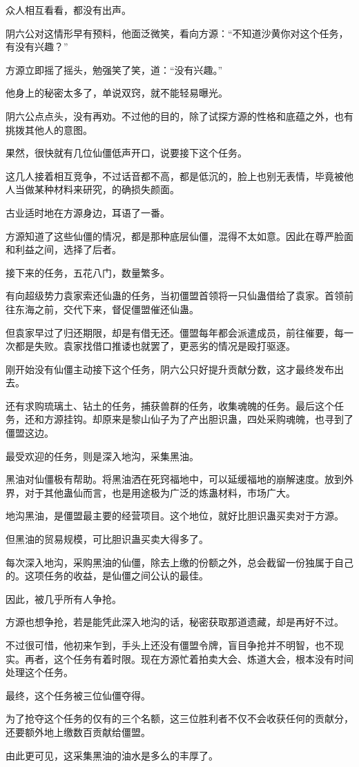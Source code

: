\begin{this_body}
众人相互看看，都没有出声。

阴六公对这情形早有预料，他面泛微笑，看向方源：“不知道沙黄你对这个任务，有没有兴趣？”

方源立即摇了摇头，勉强笑了笑，道：“没有兴趣。”

他身上的秘密太多了，单说双窍，就不能轻易曝光。

阴六公点点头，没有再劝。不过他的目的，除了试探方源的性格和底蕴之外，也有挑拨其他人的意图。

果然，很快就有几位仙僵低声开口，说要接下这个任务。

这几人接着相互竞争，不过话音都不高，都是低沉的，脸上也别无表情，毕竟被他人当做某种材料来研究，的确损失颜面。

古业适时地在方源身边，耳语了一番。

方源知道了这些仙僵的情况，都是那种底层仙僵，混得不太如意。因此在尊严脸面和利益之间，选择了后者。

接下来的任务，五花八门，数量繁多。

有向超级势力袁家索还仙蛊的任务，当初僵盟首领将一只仙蛊借给了袁家。首领前往东海之前，交代下来，督促僵盟催还仙蛊。

但袁家早过了归还期限，却是有借无还。僵盟每年都会派遣成员，前往催要，每一次都是失败。袁家找借口推诿也就罢了，更恶劣的情况是殴打驱逐。

刚开始没有仙僵主动接下这个任务，阴六公只好提升贡献分数，这才最终发布出去。

还有求购琉璃土、钻土的任务，捕获兽群的任务，收集魂魄的任务。最后这个任务，还和方源挂钩。却原来是黎山仙子为了产出胆识蛊，四处采购魂魄，也寻到了僵盟这边。

最受欢迎的任务，则是深入地沟，采集黑油。

黑油对仙僵极有帮助。将黑油洒在死窍福地中，可以延缓福地的崩解速度。放到外界，对于其他蛊仙而言，也是用途极为广泛的炼蛊材料，市场广大。

地沟黑油，是僵盟最主要的经营项目。这个地位，就好比胆识蛊买卖对于方源。

但黑油的贸易规模，可比胆识蛊买卖大得多了。

每次深入地沟，采购黑油的仙僵，除去上缴的份额之外，总会截留一份独属于自己的。这项任务的收益，是仙僵之间公认的最佳。

因此，被几乎所有人争抢。

方源也想争抢，若是能凭此深入地沟的话，秘密获取那道遗藏，却是再好不过。

不过很可惜，他初来乍到，手头上还没有僵盟令牌，盲目争抢并不明智，也不现实。再者，这个任务有着时限。现在方源忙着拍卖大会、炼道大会，根本没有时间处理这个任务。

最终，这个任务被三位仙僵夺得。

为了抢夺这个任务的仅有的三个名额，这三位胜利者不仅不会收获任何的贡献分，还要额外地上缴数百贡献给僵盟。

由此更可见，这采集黑油的油水是多么的丰厚了。

\end{this_body}


